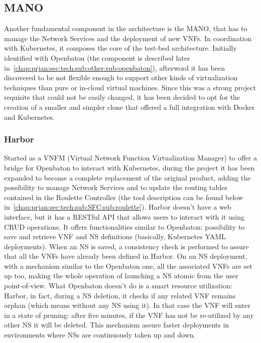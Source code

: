 \vspace{0.5cm}


\subsection{MANO}

Another fundamental component in the architecture is the MANO, that has to 
manage the Network Services and the deployment of new VNFs. In coordination 
with Kubernetes, it composes the core of the test-bed architecture. Initially 
identified with Openbaton (the component is described later 
in~\ref{chap:prjan:sec:tech:sub:other:sub:openbaton}), afterword it has been 
discovered to be not flexible enough to support other kinds of virtualization 
techniques than pure or in-cloud virtual machines. 
Since this was a strong project requisite that could not be easily changed, it 
has been decided to opt for the creation of a smaller and simpler clone that 
offered a full integration with Docker and Kubernetes.

\subsubsection{Harbor}
\label{chap:prjan:sec:tech:sub:MANO:sub:harbor}
Started as a VNFM (Virtual Network Function Virtualization Manager) to offer a
bridge for Openbaton to interact with Kubernetes, during the project it has been
expanded to become a complete replacement of the original product, adding the
possibility to manage Network Services and to update the routing tables
contained in the Roulette Controller (the tool description can be found below
in~\ref{chap:prjan:sec:tech:sub:SFC:sub:roulette}). Harbor doesn't have a web
interface, but it has a RESTful API that allows users to interact with it using
CRUD operations. It offers functionalities similar to Openbaton: possibility to
save and retrieve VNF and NS definitions (basically, Kubernetes YAML
deployments). When an NS is saved, a consistency check is performed to assure
that all the VNFs have already been defined in Harbor. On an NS deployment, with
a mechanism similar to the Openbaton one, all the associated VNFs are set up
too, making the whole operation of launching a NS atomic from the user
point-of-view. What Openbaton doesn't do is a smart resource utilization:
Harbor, in fact, during a NS deletion, it checks if any related VNF remains
orphan (which means without any NS using it). In that case the VNF will enter in
a state of pruning: after five minutes, if the VNF has not be re-utilized by any
other NS it will be deleted. This mechanism assure faster deployments in
environments where NSs are continuously taken up and down. 

